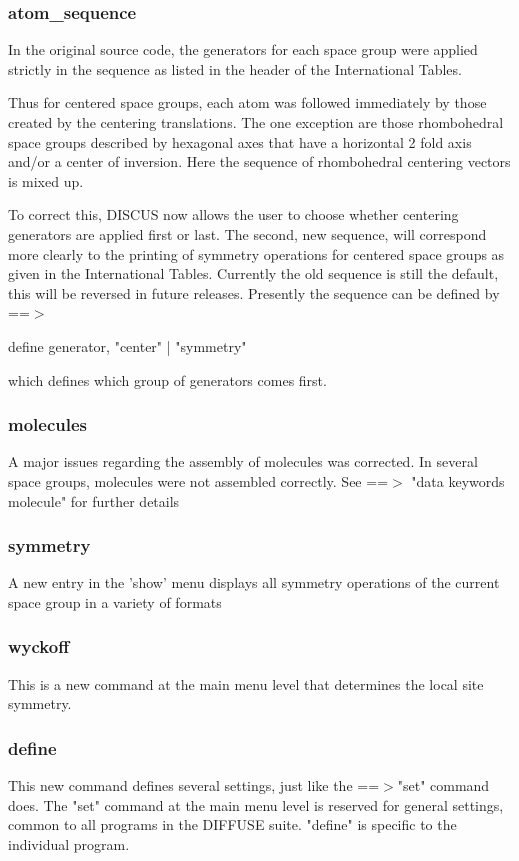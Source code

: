 \subsubsection{atom\_sequence}
\par
In the original source code, the generators for each space group 
were applied strictly in the sequence as listed in the header of 
the International Tables. 
\par
Thus for centered space groups, each atom was followed immediately 
by those created by the centering translations. The one exception 
are those rhombohedral space groups described by hexagonal axes 
that have a horizontal 2 fold axis and/or a center of inversion. 
Here the sequence of rhombohedral centering vectors is mixed up. 
\par
To correct this, DISCUS now allows the user to choose whether 
centering generators are applied first or last. The second, new 
sequence, will correspond more clearly to the printing of 
symmetry operations for centered space groups as given in the 
International Tables. Currently the old sequence is still the 
default, this will be reversed in future releases. Presently 
the sequence can be defined by ==$> $ 
\begin{MacVerbatim}
define generator, {"center" | "symmetry"}
\end{MacVerbatim}
which defines which group of generators comes first. 
\subsubsection{molecules}
\par
A major issues regarding the assembly of molecules was corrected. 
In several space groups, molecules were not assembled correctly. 
See ==$> $ "data keywords molecule" for further details 
\subsubsection{symmetry}
\par
A new entry in the 'show' menu displays all symmetry operations 
of the current space group in a variety of formats 
\subsubsection{wyckoff}
\par
This is a new command at the main menu level that determines the 
local site symmetry. 
\subsubsection{define}
\par
This new command defines several settings, just like the ==$> $"set" 
command does. The "set" command at the main menu level is reserved 
for general settings, common to all programs in the DIFFUSE suite. 
"define" is specific to the individual program. 
